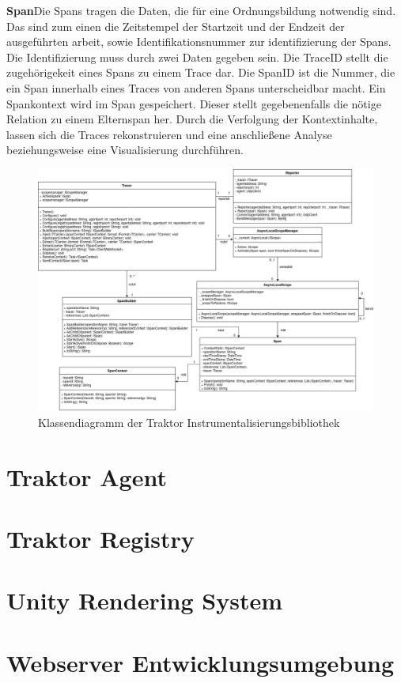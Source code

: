 \textbf{Span}\space\space\space Die Spans tragen die Daten, die für eine Ordnungsbildung notwendig sind. Das sind zum einen die Zeitstempel der Startzeit und der Endzeit der ausgeführten arbeit, sowie Identifikationsnummer zur identifizierung der Spans. Die Identifizierung muss durch zwei Daten gegeben sein. Die TraceID stellt die zugehörigekeit eines Spans zu einem Trace dar. Die SpanID ist die Nummer, die ein Span innerhalb eines Traces von anderen Spans unterscheidbar macht. Ein Spankontext wird im Span gespeichert. Dieser stellt gegebenenfalls die nötige Relation zu einem Elternspan her. Durch die Verfolgung der Kontextinhalte, lassen sich die Traces rekonstruieren und eine anschließene Analyse beziehungsweise eine Visualisierung durchführen.


\newpage
\begin{landscape}
	\begin{figure}
		\centering
		\includegraphics[scale=0.4]{img/Implementierung/TraktorKlassendiagramm.png}
		\caption[Klassendiagramm der Traktor Instrumentalisierungsbibliothek]{Klassendiagramm der Traktor Instrumentalisierungsbibliothek}
		\label{fig:TraktorKlassendiagramm}
	\end{figure}
\end{landscape}

\section{Traktor Agent}
\label{section:Traktor Agent}
\section{Traktor Registry}
\label{section:Traktor Registry}
\section{Unity Rendering System}
\label{section:Unity Rendering System}
\section{ Webserver Entwicklungsumgebung }
\label{section:Webserver Entwicklungsumgebung}
